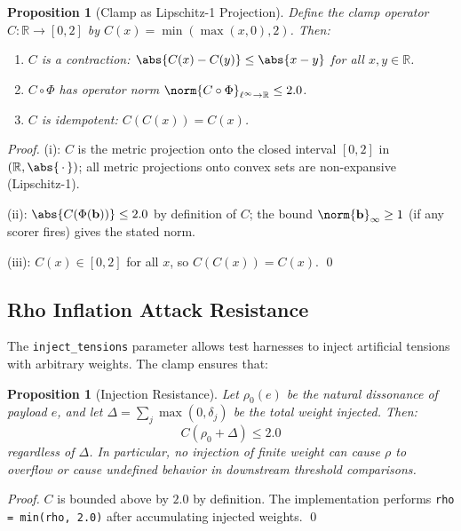 \documentclass[11pt,letterpaper]{article}
\newtheorem{proposition}[theorem]{Proposition}
\theoremstyle{remark}
\newcommand{\rhosys}{\rho}
\begin{document}
\begin{proposition}[Clamp as Lipschitz-1 Projection]
\label{prop:clamp}
Define the clamp operator $C: \mathbb{R} \to [0,2]$ by
$C(x) = \min(\max(x, 0), 2)$.  Then:
\begin{enumerate}[leftmargin=1.5em,label=(\roman*)]
  \item $C$ is a contraction: $\abs{C(x) - C(y)} \leq \abs{x - y}$
        for all $x, y \in \mathbb{R}$.
  \item $C \circ \Phi$ has operator norm
        $\norm{C \circ \Phi}_{\ell^\infty \to \mathbb{R}} \leq 2.0$.
  \item $C$ is idempotent: $C(C(x)) = C(x)$.
\end{enumerate}
\end{proposition}

\begin{proof}
(i): $C$ is the metric projection onto the closed interval $[0,2]$ in
$(\mathbb{R}, \abs{\,\cdot\,})$; all metric projections onto convex sets
are non-expansive (Lipschitz-1).

(ii): $\abs{C(\Phi(\mathbf{b}))} \leq 2.0$ by definition of $C$; the
bound $\norm{\mathbf{b}}_\infty \geq 1$ (if any scorer fires) gives the
stated norm.

(iii): $C(x) \in [0,2]$ for all $x$, so $C(C(x)) = C(x)$. \qed
\end{proof}

\subsection{Rho Inflation Attack Resistance}

The \texttt{inject\_tensions} parameter allows test harnesses to inject
artificial tensions with arbitrary weights.  The clamp ensures that:

\begin{proposition}[Injection Resistance]
\label{prop:injection-resistance}
Let $\rhosys_0(e)$ be the natural dissonance of payload $e$, and let
$\Delta = \sum_j \max(0, \delta_j)$ be the total weight injected.  Then:
\[
  C(\rhosys_0 + \Delta) \leq 2.0 \tag{A13}
\]
regardless of $\Delta$.  In particular, no injection of finite weight can
cause $\rhosys$ to overflow or cause undefined behavior in downstream
threshold comparisons.
\end{proposition}

\begin{proof}
$C$ is bounded above by $2.0$ by definition.  The implementation performs
\texttt{rho = min(rho, 2.0)} after accumulating injected weights. \qed
\end{proof}
\end{document}

